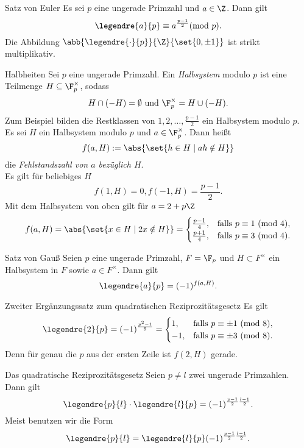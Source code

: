 \begin{karte}{Satz von Euler}
    Es sei \(p\) eine ungerade Primzahl und \(a\in \Z\). Dann gilt 
    \[ \legendre{a}{p} \equiv a^{\frac{p-1}{2}} (\mathrm{mod}\ p). \]
    Die Abbildung \( \abb{\legendre{\cdot}{p}}{\Z}{\set{0,\pm 1}} \) ist strikt multiplikativ.
\end{karte}

\begin{karte}{Halbheiten}
    Sei \(p\) eine ungerade Primzahl. Ein \textit{Halbsystem} modulo \(p\) ist 
    eine Teilmenge \(H\subseteq \F_p^\times\), sodass 
    \[ H \cap (-H) = \emptyset \text{ und } \F_p^\times = H \cup (-H). \]
    Zum Beispiel bilden die Restklassen von \(1,2,\ldots, \frac{p-1}{2}\) ein Halbsystem modulo \(p\).\\
    Es sei \(H\) ein Halbsystem modulo \(p\) und \(a\in \F_p^\times\). Dann heißt 
    \[ f(a,H) := \abs{ \set{h\in H \;|\; ah\notin H} } \]
    die \textit{Fehlstandszahl von \(a\) bezüglich \(H\)}.\\
    Es gilt für beliebiges \(H\)
    \[ f(1,H) = 0, f(-1,H) = \frac{p-1}{2}. \]
    Mit dem Halbsystem von oben gilt für \(a = 2+p\Z\) 
    \[ f(a,H) = \abs{\set{ x\in H \;|\; 2x \notin H }} = \begin{cases}
        \frac{p-1}{4}, &\text{falls } p \equiv 1\ (\mathrm{mod}\ 4), \\
        \frac{p+1}{4}, &\text{falls } p \equiv 3\ (\mathrm{mod}\ 4).
    \end{cases} \]
\end{karte}

\begin{karte}{Satz von Gauß}
    Seien \(p\) eine ungerade Primzahl, \(F = \F_p\) und 
    \(H\subset F^\times\) ein Halbsystem in \(F\) sowie \(a\in F^\times\).
    Dann gilt 
    \[ \legendre{a}{p} = (-1)^{f(a,H)}. \]
\end{karte}

\begin{karte}{Zweiter Ergänzungssatz zum quadratischen Reziprozitätsgesetz}
    Es gilt 
    \[ \legendre{2}{p} = (-1)^{\frac{p^2-1}{8}} 
    = \begin{cases}
        1, &\text{falls } p \equiv \pm 1\ (\mathrm{mod}\ 8), \\
        -1, &\text{falls } p \equiv \pm 3\ (\mathrm{mod}\ 8).
    \end{cases} \]
    Denn für genau die \(p\) aus der ersten Zeile ist \(f(2,H) \) gerade.
\end{karte}

\begin{karte}{Das quadratische Reziprozitätsgesetz}
    Seien \(p\neq l\) zwei ungerade Primzahlen. Dann gilt 
    \[ \legendre{p}{l} \cdot \legendre{l}{p} = (-1)^{\frac{p-1}{2} \frac{l-1}{2}}. \]
    Meist benutzen wir die Form 
    \[ \legendre{p}{l} = \legendre{l}{p} (-1)^{\frac{p-1}{2} \frac{l-1}{2}}. \]
\end{karte}